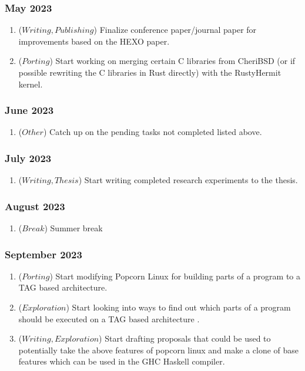   \subsubsection{May 2023}
  \begin{enumerate}
     \item (\(Writing, Publishing\)) Finalize conference paper/journal paper for improvements based on the HEXO paper.
     \item (\(Porting\)) Start working on merging certain C libraries from CheriBSD (or if possible rewriting the C libraries in Rust directly) 
     with the RustyHermit kernel.
  \end{enumerate}

  \subsubsection{June 2023}
  \begin{enumerate}
     \item (\(Other\)) Catch up on the pending tasks not completed listed above. 
  \end{enumerate}

  \subsubsection{July 2023}
  \begin{enumerate}
     \item (\(Writing, Thesis\)) Start writing completed research experiments to the thesis. 
  \end{enumerate}

  \subsubsection{August 2023}
  \begin{enumerate}
    \item (\(Break\)) Summer break 
 \end{enumerate}

 \subsubsection{September 2023}
  \begin{enumerate}
    \item (\(Porting\)) Start modifying Popcorn Linux for building parts of a program to a TAG based architecture.
    \item (\(Exploration\)) Start looking into ways to find out which parts of a program should be executed on a TAG based architecture \cite{PopcornEnclave}.
    \item (\(Writing, Exploration\)) Start drafting proposals that could be used to potentially take the above features of popcorn linux and make a clone of 
    base features which can be used in the GHC Haskell compiler.
 \end{enumerate}


